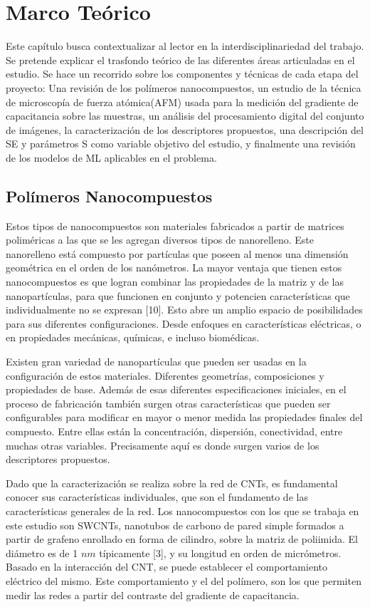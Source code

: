 \chapter{Marco Teórico}
Este capítulo busca contextualizar al lector en la interdisciplinariedad del trabajo. Se pretende explicar el trasfondo teórico de las diferentes áreas articuladas en el estudio. Se hace un recorrido sobre los componentes y técnicas de cada etapa del proyecto: Una revisión de los polímeros nanocompuestos, un estudio de la técnica de microscopía de fuerza atómica(AFM) usada para la medición del gradiente de capacitancia sobre las muestras, un análisis del procesamiento digital del conjunto de imágenes, la caracterización de los descriptores propuestos, una descripción del SE y parámetros S como variable objetivo del estudio, y finalmente una revisión de los modelos de ML aplicables en el problema.

\section{Polímeros Nanocompuestos}
Estos tipos de nanocompuestos son materiales fabricados a partir de matrices poliméricas a las que se les agregan diversos tipos de nanorelleno. Este nanorelleno está compuesto por partículas que poseen al menos una dimensión geométrica en el orden de los nanómetros. La mayor ventaja que tienen estos nanocompuestos es que logran combinar las propiedades de la matriz y de las nanopartículas, para que funcionen en conjunto y potencien características que individualmente no se expresan [10]. Esto abre un amplio espacio de posibilidades para sus diferentes configuraciones. Desde enfoques en características eléctricas, o en propiedades mecánicas, químicas, e incluso biomédicas.

Existen gran variedad de nanopartículas que pueden ser usadas en la configuración de estos materiales. Diferentes geometrías, composiciones y propiedades de base. Además de esas diferentes especificaciones iniciales, en el proceso de fabricación también surgen otras características que pueden ser configurables para modificar en mayor o menor medida las propiedades finales del compuesto. Entre ellas están la concentración, dispersión, conectividad, entre muchas otras variables. Precisamente aquí es donde surgen varios de los descriptores propuestos.

Dado que la caracterización se realiza sobre la red de CNTs, es fundamental conocer sus características individuales, que son el fundamento de las características generales de la red. Los nanocompuestos con los que se trabaja en este estudio son SWCNTs, nanotubos de carbono de pared simple formados a partir de grafeno enrollado en forma de cilindro, sobre la matriz de poliimida. El diámetro es de 1 $nm$ típicamente [3], y su longitud en orden de micrómetros. Basado en la interacción del CNT, se puede establecer el comportamiento eléctrico del mismo. Este comportamiento y el del polímero, son los que permiten medir las redes a partir del contraste del gradiente de capacitancia.


